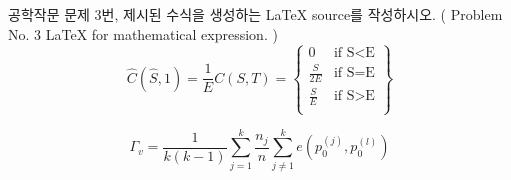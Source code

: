 \documentclass[14pt,a4paper]{oblivoir}
\begin{document}
공학작문 문제 3번, 제시된 수식을 생성하는 LaTeX source를 작성하시오. 
( Problem No. 3 LaTeX for mathematical expression. ) \\
  



\begin{equation} %
	\hat{C}(\hat{S}, 1) = \frac{1}{E}C(S,T)= \left\{ \begin{array}{ll}
		0 & \mbox{if S<E}\\
		\frac{S}{2E} & \mbox{if S=E}\\
		\frac{S}{E} & \mbox{if S>E}\\
	\end{array} \right\} 
\end{equation}

\bigskip 

\begin{equation}  %
	\Gamma_v = \frac{1}{k(k-1)} \sum_{j=1}^{k} \frac{n_j}{n}
	\sum_{j\neq1}^{k} e(p_0^{(j)},p_0^{(l)})
\end{equation}
\end{document}
